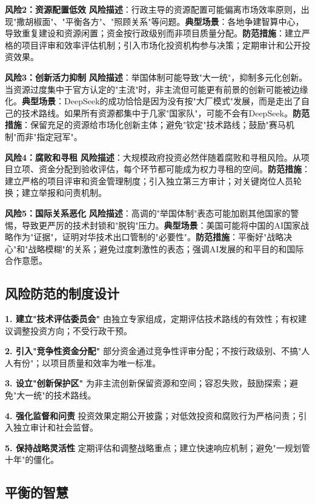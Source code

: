 \textbf{风险2：资源配置低效}
\textbf{风险描述}：行政主导的资源配置可能偏离市场效率原则，出现"撒胡椒面"、"平衡各方"、"照顾关系"等问题。\textbf{典型场景}：各地争建智算中心，导致重复建设和资源闲置；资金按行政级别而非项目质量分配。\textbf{防范措施}：建立严格的项目评审和效率评估机制；引入市场化投资机构参与决策；定期审计和公开投资效果。

\textbf{风险3：创新活力抑制}
\textbf{风险描述}：举国体制可能导致"大一统"，抑制多元化创新。当资源过度集中于官方认定的"主流"时，非主流但可能更有前景的创新可能被边缘化。\textbf{典型场景}：DeepSeek的成功恰恰是因为没有按"大厂模式"发展，而是走出了自己的技术路线。如果所有资源都集中于几家"国家队"，可能不会有DeepSeek。\textbf{防范措施}：保留充足的资源给市场化创新主体；避免"钦定"技术路线；鼓励"赛马机制"而非"指定冠军"。

\textbf{风险4：腐败和寻租}
\textbf{风险描述}：大规模政府投资必然伴随着腐败和寻租风险。从项目立项、资金分配到验收评估，每个环节都可能成为权力寻租的空间。\textbf{防范措施}：建立严格的项目评审和资金管理制度；引入独立第三方审计；对关键岗位人员轮换；建立举报和问责机制。

\textbf{风险5：国际关系恶化}
\textbf{风险描述}：高调的"举国体制"表态可能加剧其他国家的警惕，导致更严厉的技术封锁和"脱钩"压力。\textbf{典型场景}：美国可能将中国的AI国家战略作为"证据"，证明对华技术出口管制的"必要性"。\textbf{防范措施}：平衡好"战略决心"和"战略模糊"的关系；避免过度刺激性的表态；强调AI发展的和平目的和国际合作意愿。

\subsection{风险防范的制度设计}

\textbf{1. 建立"技术评估委员会"}
由独立专家组成，定期评估技术路线的有效性；有权建议调整投资方向；不受行政干预。

\textbf{2. 引入"竞争性资金分配"}
部分资金通过竞争性评审分配；不按行政级别、不搞"人人有份"；以项目质量和效率为唯一标准。

\textbf{3. 设立"创新保护区"}
为非主流创新保留资源和空间；容忍失败，鼓励探索；避免"大一统"的技术路线。

\textbf{4. 强化监督和问责}
投资效果定期公开披露；对低效投资和腐败行为严格问责；引入独立审计和社会监督。

\textbf{5. 保持战略灵活性}
定期评估和调整战略重点；建立快速响应机制；避免"一规划管十年"的僵化。

\subsection{平衡的智慧}

